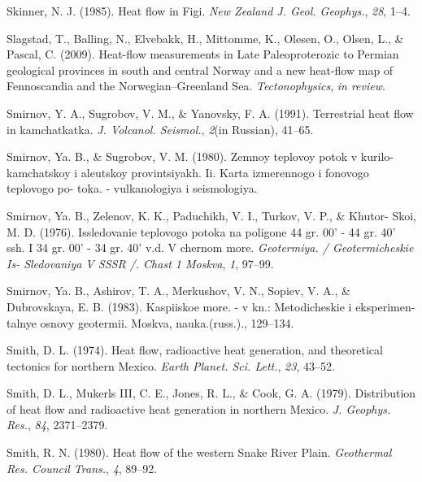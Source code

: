 \begin{CSLReferences}{1}{1}
\leavevmode{}%
Skinner, N. J. (1985). Heat flow in {Figi}. \emph{New Zealand J. Geol. Geophys.}, \emph{28}, 1--4.

\leavevmode{}%
Slagstad, T., Balling, N., Elvebakk, H., Mittomme, K., Olesen, O., Olsen, L., \& Pascal, C. (2009). Heat-flow measurements in {Late Paleoproterozic to Permian} geological provinces in south and central {Norway} and a new heat-flow map of {Fennoscandia and the Norwegian--Greenland Sea}. \emph{Tectonophysics}, \emph{in review}.

\leavevmode{}%
Smirnov, Y. A., Sugrobov, V. M., \& Yanovsky, F. A. (1991). Terrestrial heat flow in kamchatkatka. \emph{J. Volcanol. Seismol.}, \emph{2}(in Russian), 41--65.

\leavevmode{}%
Smirnov, Ya. B., \& Sugrobov, V. M. (1980). Zemnoy teplovoy potok v kurilo-kamchatskoy i aleutskoy provintsiyakh. Ii. Karta izmerennogo i fonovogo teplovogo po- toka. - vulkanologiya i seismologiya.

\leavevmode{}%
Smirnov, Ya. B., Zelenov, K. K., Paduchikh, V. I., Turkov, V. P., \& Khutor- Skoi, M. D. (1976). Issledovanie teplovogo potoka na poligone 44 gr. 00' - 44 gr. 40' ssh. I 34 gr. 00' - 34 gr. 40' v.d. V chernom more. \emph{Geotermiya. / Geotermicheskie Is- Sledovaniya V SSSR /. Chast 1 Moskva}, \emph{1}, 97--99.

\leavevmode{}%
Smirnov, Ya. B., Ashirov, T. A., Merkushov, V. N., Sopiev, V. A., \& Dubrovskaya, E. B. (1983). Kaspiiskoe more. - v kn.: Metodicheskie i eksperimen- talnye osnovy geotermii. Moskva, nauka.(russ.)., 129--134.

\leavevmode{}%
Smith, D. L. (1974). Heat flow, radioactive heat generation, and theoretical tectonics for northern {Mexico}. \emph{Earth Planet. Sci. Lett.}, \emph{23}, 43--52.

\leavevmode{}%
Smith, D. L., Mukerls III, C. E., Jones, R. L., \& Cook, G. A. (1979). Distribution of heat flow and radioactive heat generation in northern {Mexico}. \emph{J. Geophys. Res.}, \emph{84}, 2371--2379.

\leavevmode{}%
Smith, R. N. (1980). Heat flow of the western {Snake River Plain}. \emph{Geothermal Res. Council Trans.}, \emph{4}, 89--92.


\end{CSLReferences}
